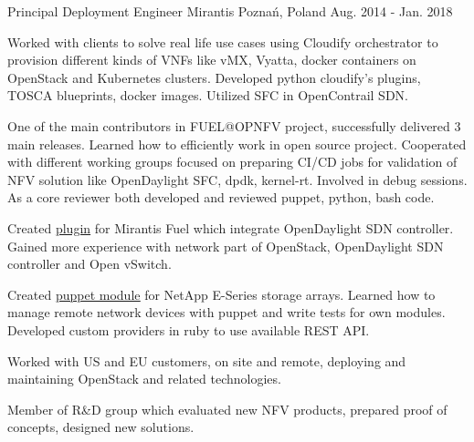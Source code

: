 \begin{cventries}
  \cventry
    {Principal Deployment Engineer} %
    {Mirantis} %
    {Poznań, Poland} %
    {Aug. 2014 - Jan. 2018} %
    {
      \begin{cvitems} %
        \item {Worked with clients to solve real life use cases using Cloudify orchestrator to provision different
               kinds of VNFs like vMX, Vyatta, docker containers on OpenStack and Kubernetes clusters.
               Developed python cloudify's plugins, TOSCA blueprints, docker images. Utilized SFC in OpenContrail SDN.}
        \item {One of the main contributors in FUEL@OPNFV project, successfully delivered 3 main releases.
               Learned how to efficiently work in open source project. Cooperated with different working groups
               focused on preparing CI/CD jobs for validation of NFV solution like OpenDaylight SFC, dpdk, kernel-rt.
               Involved in debug sessions. As a core reviewer both developed and reviewed puppet, python, bash code.}
        \item {Created \underline{\href{https://github.com/openstack/fuel-plugin-opendaylight}{plugin}}
               for Mirantis Fuel which integrate OpenDaylight SDN controller. Gained more experience with network part
               of OpenStack, OpenDaylight SDN controller and Open vSwitch.}
        \item {Created \underline{\href{https://github.com/NetApp/puppet-eseries/graphs/contributors}{puppet module}}
               for NetApp E-Series storage arrays. Learned how to manage remote network devices with puppet
               and write tests for own modules. Developed custom providers in ruby to use available REST API.}
        \item {Worked with US and EU customers, on site and remote, deploying and maintaining OpenStack and related technologies.}
        \item {Member of R\&D group which evaluated new NFV products, prepared proof of concepts, designed new solutions.}
      \end{cvitems}
    }


\end{cventries}
